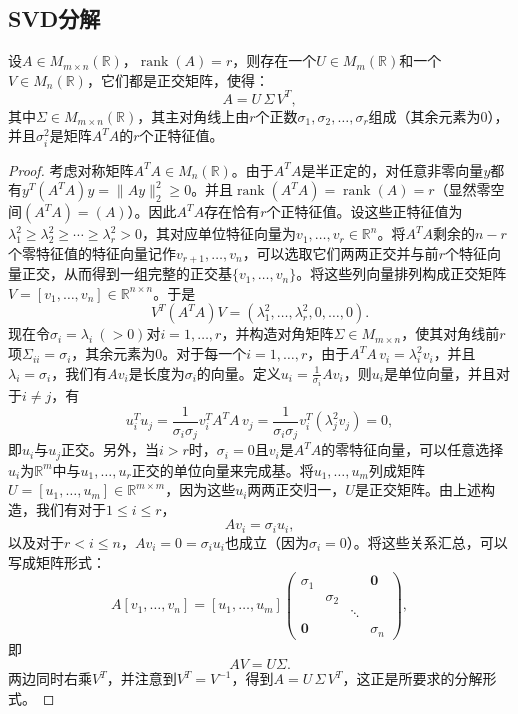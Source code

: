 \subsection{SVD分解}
\begin{theorem}\label{theo:SVD}
	设$A\in M_{m\times n}(\mathbb{R})$，$\operatorname{rank}(A)=r$，则存在一个$U\in M_{m}(\mathbb{R})$和一个$V\in M_{n}(\mathbb{R})$，它们都是正交矩阵，使得：
	\[ 
	A = U\,\Sigma\,V^T,
	\] 
	其中$\Sigma\in M_{m\times n}(\mathbb{R})$，其主对角线上由$r$个正数$\sigma_1,\sigma_2,\dots,\sigma_r$组成（其余元素为$0$），并且$\sigma_i^2$是矩阵$A^T A$的$r$个正特征值。
\end{theorem}
\begin{proof}
	考虑对称矩阵$A^T A\in M_{n}(\mathbb{R})$。由于$A^T A$是半正定的，对任意非零向量$y$都有$y^T (A^T A) y = \|Ay\|_2^2 \ge 0$。并且$\operatorname{rank}(A^T A) = \operatorname{rank}(A) = r$（显然零空间$(A^T A)=(A)$）。因此$A^T A$存在恰有$r$个正特征值。设这些正特征值为$\lambda_1^2 \ge \lambda_2^2 \ge \cdots \ge \lambda_r^2>0$，其对应单位特征向量为$v_1,\dots,v_r\in \mathbb{R}^n$。将$A^T A$剩余的$n-r$个零特征值的特征向量记作$v_{r+1},\dots,v_n$，可以选取它们两两正交并与前$r$个特征向量正交，从而得到一组完整的正交基$\{v_1,\dots,v_n\}$。将这些列向量排列构成正交矩阵$V=[v_1,\dots,v_n]\in \mathbb{R}^{n\times n}$。于是
	\[ V^T (A^T A) V = (\lambda_1^2,\dots,\lambda_r^2,0,\dots,0).\] 
	现在令$\sigma_i = \lambda_i\ (>0)$对$i=1,\dots,r$，并构造对角矩阵$\Sigma \in M_{m\times n}$，使其对角线前$r$项$\Sigma_{ii}=\sigma_i$，其余元素为0。对于每一个$i=1,\dots,r$，由于$A^T A\,v_i = \lambda_i^2 v_i$，并且$\lambda_i=\sigma_i$，我们有$A v_i$是长度为$\sigma_i$的向量。定义$u_i = \frac{1}{\sigma_i} A v_i$，则$u_i$是单位向量，并且对于$i\neq j$，有
	\[ u_i^T u_j = \frac{1}{\sigma_i \sigma_j} v_i^T A^T A\, v_j = \frac{1}{\sigma_i \sigma_j} v_i^T (\lambda_j^2 v_j) = 0, \] 
	即$u_i$与$u_j$正交。另外，当$i>r$时，$\sigma_i=0$且$v_i$是$A^T A$的零特征向量，可以任意选择$u_i$为$\mathbb{R}^m$中与$u_1,\dots,u_r$正交的单位向量来完成基。将$u_1,\dots,u_m$列成矩阵$U=[u_1,\dots,u_m]\in \mathbb{R}^{m\times m}$，因为这些$u_i$两两正交归一，$U$是正交矩阵。由上述构造，我们有对于$1\le i\le r$，
	\[ A v_i = \sigma_i u_i, \] 
	以及对于$r<i\le n$，$A v_i = 0 = \sigma_i u_i$也成立（因为$\sigma_i=0$）。将这些关系汇总，可以写成矩阵形式：
	\[ A [v_1,\dots,v_n] = [u_1,\dots,u_m] \begin{pmatrix}
		\sigma_1 & & & \mathbf{0}\\
		& \sigma_2 & & \\
		& & \ddots & \\
		\mathbf{0} & & & \sigma_n
	\end{pmatrix}, \] 
	即 
	\[ A V = U \Sigma. \] 
	两边同时右乘$V^T$，并注意到$V^T=V^{-1}$，得到$A = U\,\Sigma\,V^T$，这正是所要求的分解形式。
\end{proof}

